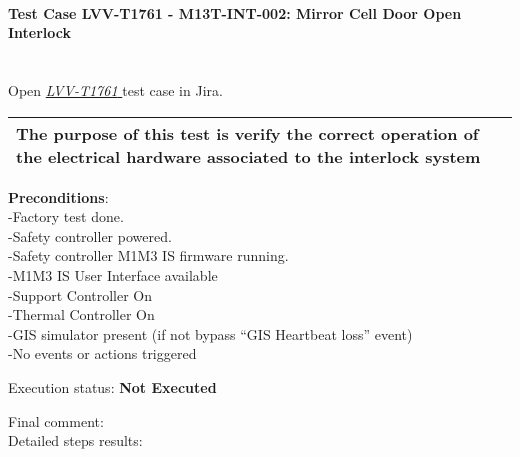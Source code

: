 \documentclass[SE,lsstdraft,STR,toc]{lsstdoc}
\begin{document}
\paragraph{Test Case LVV-T1761 - M13T-INT-002: Mirror Cell Door Open Interlock }\mbox{}\\

Open  \href{https://jira.lsstcorp.org/secure/Tests.jspa#/testCase/LVV-T1761}{\textit{ LVV-T1761 } }
test case in Jira.

\begin{longtable}[]{@{}ll@{}}
\toprule
The purpose of this test is verify the correct operation of the
electrical hardware associated to the interlock system &\tabularnewline
\bottomrule
\end{longtable}

\textbf{ Preconditions}:\\
-Factory test done.\\
-Safety controller powered.\\
-Safety controller M1M3 IS firmware running.\\
-M1M3 IS User Interface available\\
-Support Controller On\\
-Thermal Controller On\\
-GIS simulator present (if not bypass ``GIS Heartbeat loss'' event)\\
-No events or actions triggered

Execution status: {\bf Not Executed }

Final comment:\\


Detailed steps results:
\end{document}
